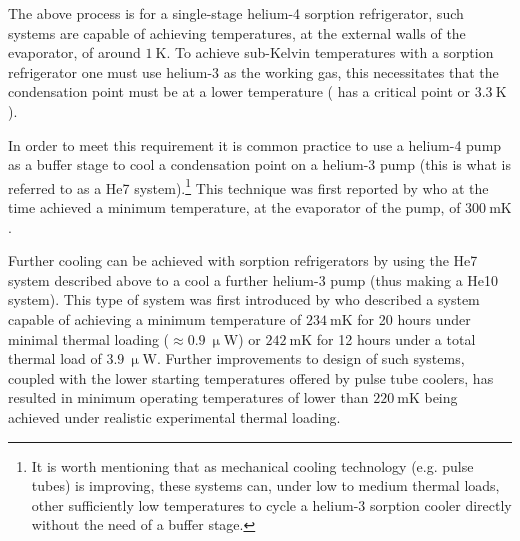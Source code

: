 \par
The above process is for a single-stage helium-4 sorption refrigerator, such systems are capable of achieving temperatures, at the external walls of the evaporator, of around $1~\mathrm{K}$. To achieve sub-Kelvin temperatures with a sorption refrigerator one must use helium-3 as the working gas, this necessitates that the condensation point must be at a lower temperature ( has a critical point or $3.3~\mathrm{K}$). 
\par 
In order to meet this requirement it is common practice to use a helium-4 pump as a buffer stage to cool a condensation point on a helium-3 pump (this is what is referred to as a He7 system).\footnote{It is worth mentioning that as mechanical cooling technology (e.g. pulse tubes) is improving, these systems can, under low to medium thermal loads, other sufficiently low temperatures to cycle a helium-3 sorption cooler directly without the need of a buffer stage.} This technique was first reported by \textcite{DallOglio1991} who at the time achieved a minimum temperature, at the evaporator of the  pump, of $300~\mathrm{mK}$.
\par 
Further cooling can be achieved with sorption refrigerators by using the He7 system described above to a cool a further helium-3 pump (thus making a He10 system). This type of system was first introduced by \textcite{Bhatia2000} who described a system capable of achieving a minimum temperature of $234~\mathrm{mK}$ for 20 hours under minimal thermal loading ($\approx 0.9~\mathrm{\upmu W}$) or $242~\mathrm{mK}$ for 12 hours under a total thermal load of $3.9~\mathrm{\upmu W}$. Further improvements to design of such systems, coupled with the lower starting temperatures offered by pulse tube coolers, has resulted in minimum operating temperatures of lower than $220~\mathrm{mK}$ being achieved under realistic experimental thermal loading.
%
